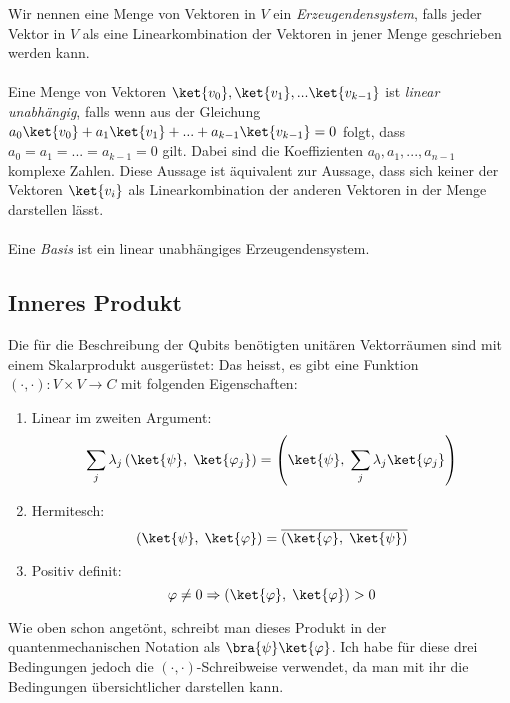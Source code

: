 Wir nennen eine Menge von Vektoren in $V$ ein \textit{Erzeugendensystem}, falls jeder Vektor in $V$ als eine Linearkombination der Vektoren in jener Menge geschrieben werden kann. 
\paragraph{}
Eine Menge von Vektoren $\ket{v_0}, \ket{v_1}, ... \ket{v_{k - 1}}$ ist \textit{linear unabhängig}, falls wenn aus der Gleichung $a_0\ket{v_0} + a_1\ket{v_1} + ... + a_{k - 1}\ket{v_{k - 1}} = 0$ folgt, dass $a_0 = a_1 = ... = a_{k - 1} = 0$ gilt. Dabei sind die Koeffizienten $a_0, a_1, ..., a_{n - 1}$ komplexe Zahlen. Diese Aussage ist äquivalent zur Aussage, dass sich keiner der Vektoren $\ket{v_{i}}$ als Linearkombination der anderen Vektoren in der Menge darstellen lässt.

\paragraph{}
Eine \textit{Basis} ist ein linear unabhängiges Erzeugendensystem.

\subsection{Inneres Produkt}
Die für die Beschreibung der Qubits benötigten unitären Vektorräumen sind mit einem Skalarprodukt ausgerüstet: Das heisst, es gibt eine Funktion $(\cdot, \cdot) : V \times V \rightarrow C$ mit folgenden Eigenschaften:
\begin{enumerate}
    \item Linear im zweiten Argument: $$\sum_j\lambda_j\left(\ket{\psi}, \; \ket{\varphi_j}\right) = \left(\ket{\psi}, \; \sum_j\lambda_j\ket{\varphi_j}\right)$$
    \item Hermitesch: $$\left(\ket{\psi}, \; \ket{\varphi} \right) = \overline{\left(\ket{\varphi} , \; \ket{\psi}\right)}$$
    \item Positiv definit: $$\varphi \neq 0 \Rightarrow \left( \ket{\varphi}, \; \ket{\varphi} \right) > 0$$
\end{enumerate}
Wie oben schon angetönt, schreibt man dieses Produkt in der quantenmechanischen Notation als $\bra{\psi}\ket{\varphi}$. Ich habe für diese drei Bedingungen jedoch die $(\cdot, \cdot)$-Schreibweise verwendet, da man mit ihr die Bedingungen übersichtlicher darstellen kann.
